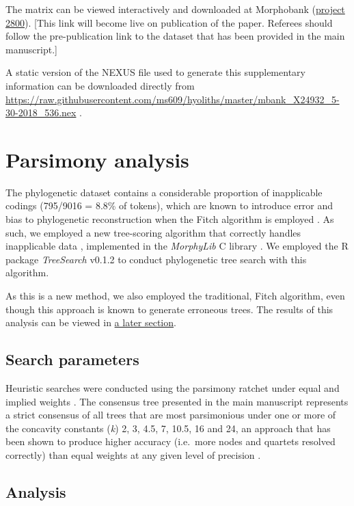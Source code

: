 \documentclass[openany]{book}
\theoremstyle{definition}
\theoremstyle{definition}
\theoremstyle{definition}
\theoremstyle{remark}
\begin{document}
The matrix can be viewed interactively and downloaded at Morphobank
(\href{https://morphobank.org/permalink/?P2800}{project 2800}). {[}This
link will become live on publication of the paper. Referees should
follow the pre-publication link to the dataset that has been provided in
the main manuscript.{]}

A static version of the NEXUS file used to generate this supplementary
information can be downloaded directly from
\url{https://raw.githubusercontent.com/ms609/hyoliths/master/mbank_X24932_5-30-2018_536.nex}
.

\hypertarget{treesearch}{\chapter{Parsimony analysis}\label{treesearch}}

The phylogenetic dataset contains a considerable proportion of
inapplicable codings (795/9016 = 8.8\% of tokens), which are known to
introduce error and bias to phylogenetic reconstruction when the Fitch
algorithm is employed \citep{Maddison1993, Brazeau2018}. As such, we
employed a new tree-scoring algorithm that correctly handles
inapplicable data \citep{Brazeau2018}, implemented in the
\emph{MorphyLib} C library \citep{Brazeau2017Morphylib}. We employed the
R package \emph{TreeSearch} v0.1.2 \citep{Smith2018TreeSearch} to
conduct phylogenetic tree search with this algorithm.

As this is a new method, we also employed the traditional, Fitch
algorithm, even though this approach is known to generate erroneous
trees. The results of this analysis can be viewed in
\protect\hyperlink{fitch}{a later section}.

\section{Search parameters}\label{search-parameters}

Heuristic searches were conducted using the parsimony ratchet
\citep{Nixon1999} under equal and implied weights \citep{Goloboff1997}.
The consensus tree presented in the main manuscript represents a strict
consensus of all trees that are most parsimonious under one or more of
the concavity constants (\emph{k}) 2, 3, 4.5, 7, 10.5, 16 and 24, an
approach that has been shown to produce higher accuracy (i.e.~more nodes
and quartets resolved correctly) than equal weights at any given level
of precision \citep{Smith2017}.

\section{Analysis}\label{analysis}
\end{document}
